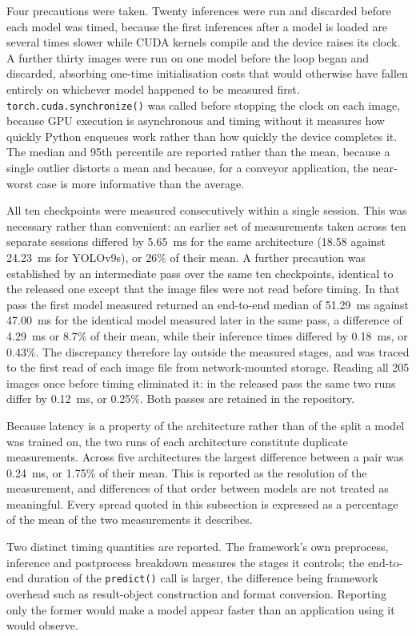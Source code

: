 Four precautions were taken. Twenty inferences were run and discarded before
each model was timed, because the first inferences after a model is loaded are
several times slower while CUDA kernels compile and the device raises its clock.
A further thirty images were run on one model before the loop began and
discarded, absorbing one-time initialisation costs that would otherwise have
fallen entirely on whichever model happened to be measured first.
\texttt{torch.cuda.synchronize()} was called before stopping the clock on each
image, because GPU execution is asynchronous and timing without it measures how
quickly Python enqueues work rather than how quickly the device completes it.
The median and 95th percentile are reported rather than the mean, because a
single outlier distorts a mean and because, for a conveyor application, the
near-worst case is more informative than the average.

All ten checkpoints were measured consecutively within a single session. This was
necessary rather than convenient: an earlier set of measurements taken across ten
separate sessions differed by 5.65~ms for the same architecture (18.58 against
24.23~ms for YOLOv9s), or 26\% of their mean. A further precaution was
established by an intermediate pass over the same ten checkpoints, identical to
the released one except that the image files were not read before timing. In that
pass the first model measured returned an end-to-end median of 51.29~ms against
47.00~ms for the identical model measured later in the same pass, a difference of
4.29~ms or 8.7\% of their mean, while their inference times differed by 0.18~ms,
or 0.43\%. The discrepancy therefore lay outside the measured stages, and was
traced to the first read of each image file from network-mounted storage. Reading
all 205 images once before timing eliminated it: in the released pass the same two
runs differ by 0.12~ms, or 0.25\%. Both passes are retained in the repository.

Because latency is a property of the architecture rather than of the split a
model was trained on, the two runs of each architecture constitute duplicate
measurements. Across five architectures the largest difference between a pair was
0.24~ms, or 1.75\% of their mean. This is reported as the resolution of the
measurement, and differences of that order between models are not treated as
meaningful. Every spread quoted in this subsection is expressed as a percentage
of the mean of the two measurements it describes.

Two distinct timing quantities are reported. The framework's own
preprocess, inference and postprocess breakdown measures the stages it controls;
the end-to-end duration of the \texttt{predict()} call is larger, the difference
being framework overhead such as result-object construction and format
conversion. Reporting only the former would make a model appear faster than an
application using it would observe.

